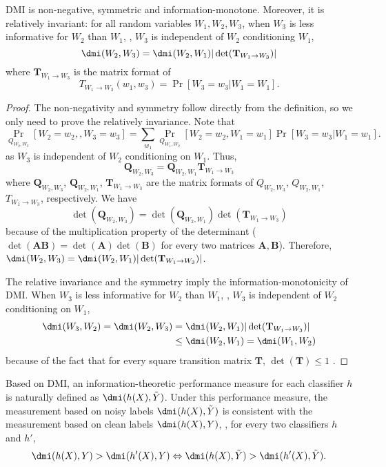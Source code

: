 \begin{lemma}
	DMI is non-negative, symmetric and information-monotone. Moreover, it is relatively invariant: for all random variables $W_1, W_2, W_3$, when $W_3$ is less informative for $W_2$ than $W_1$, \ie, $W_3$ is independent of $W_2$ conditioning $W_1$,  \[\dmi(W_2,W_3)=\dmi(W_2,W_1)|\det(\mathbf{T}_{W_1\rightarrow W_3})|\] where $\mathbf{T}_{W_1\rightarrow W_3}$ is the matrix format of \[T_{W_1 \rightarrow W_3}(w_1,w_3)=\Pr[W_3=w_3|W_1=W_1].\]  
\end{lemma}
\begin{proof}
The non-negativity and symmetry follow directly from the definition, so we only need to prove the relatively invariance. Note that
 \[\Pr_{Q_{W_2,W_3}}[W_2=w_2,,W_3=w_3]=\sum_{w_1} \Pr_{Q_{W_1,W_2}}[W_2=w_2, W_1=w_1]\Pr[W_3=w_3|W_1=w_1].\]
as $W_3$ is independent of $W_2$ conditioning on $W_1$. 
Thus, \[\mathbf{Q}_{W_2,W_3}=\mathbf{Q}_{W_2,W_1} \mathbf{T}_{W_1 \rightarrow W_3}\] where $\mathbf{Q}_{W_2,W_3}$, $\mathbf{Q}_{W_2,W_1}$, $\mathbf{T}_{W_1 \rightarrow W_3}$ are the matrix formats of $Q_{W_2,W_3}$, $Q_{W_2,W_1}$, $T_{W_1 \rightarrow W_3}$, respectively. 
We have \[\det(\mathbf{Q}_{W_2,W_3}) = \det(\mathbf{Q}_{W_2,W_1}) \det (\mathbf{T}_{W_1 \rightarrow W_3}) \] because of the multiplication property of the determinant (\ie $\det(\mathbf{AB})=\det(\mathbf{A})\det(\mathbf{B})$ for every two matrices $\mathbf{A}, \mathbf{B}$). Therefore, $\dmi(W_2,W_3)=\dmi(W_2,W_1)|\det(\mathbf{T}_{W_1\rightarrow W_3})|$.

The relative invariance and the symmetry imply the information-monotonicity of DMI. When $W_3$ is less informative for $W_2$ than $W_1$, \ie, $W_3$ is independent of $W_2$ conditioning on $W_1$, 
\begin{align*}
    \dmi(W_3,W_2) = \dmi(W_2,W_3) &= \dmi(W_2,W_1)|\det(\mathbf{T}_{W_1\rightarrow W_3})|\\
     &\leq \dmi(W_2,W_1) = \dmi(W_1,W_2)
\end{align*} because of the fact that for every square transition matrix $\mathbf{T}$, $\det(\mathbf{T})\leq 1$ \cite{seneta2006non}. 
\end{proof}

Based on DMI, an information-theoretic performance measure for each classifier $h$ is naturally defined as $\dmi(h(X),\tilde{Y})$. Under this performance measure, the measurement based on noisy labels $\dmi(h(X),\tilde{Y})$ is consistent with the measurement based on clean labels $\dmi(h(X),Y)$, \ie, for every two classifiers $h$ and $h'$, 
\[ \dmi(h(X),Y)>\dmi(h'(X),Y) \Leftrightarrow \dmi(h(X),\tilde{Y})> \dmi(h'(X),\tilde{Y}). \]  


